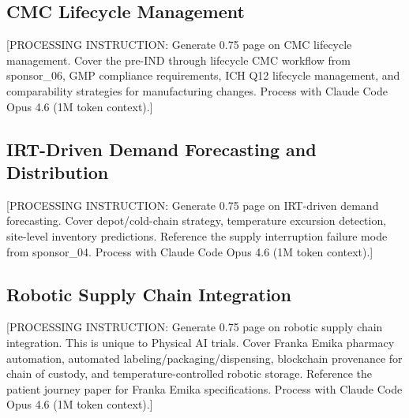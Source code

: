 \subsection{CMC Lifecycle Management}

[PROCESSING INSTRUCTION: Generate 0.75 page on CMC lifecycle management. Cover the
pre-IND through lifecycle CMC workflow from sponsor\_06, GMP compliance requirements,
ICH Q12 lifecycle management, and comparability strategies for manufacturing changes.
Process with Claude Code Opus 4.6 (1M token context).]

\subsection{IRT-Driven Demand Forecasting and Distribution}

[PROCESSING INSTRUCTION: Generate 0.75 page on IRT-driven demand forecasting. Cover
depot/cold-chain strategy, temperature excursion detection, site-level inventory
predictions. Reference the supply interruption failure mode from sponsor\_04.
Process with Claude Code Opus 4.6 (1M token context).]

\subsection{Robotic Supply Chain Integration}

[PROCESSING INSTRUCTION: Generate 0.75 page on robotic supply chain integration. This
is unique to Physical AI trials. Cover Franka Emika pharmacy automation, automated
labeling/packaging/dispensing, blockchain provenance for chain of custody, and
temperature-controlled robotic storage. Reference the patient journey paper
for Franka Emika specifications. Process with Claude Code Opus 4.6 (1M token context).]
